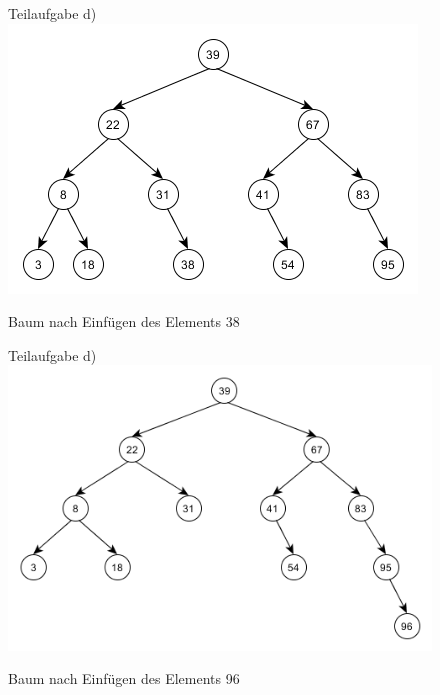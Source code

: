 \documentclass[12pt]{scrartcl}
\begin{document}
\begin{figure}[h!]
\begin{center}
Teilaufgabe d)
\includegraphics[scale=0.8]{Aufgabe2d)B4.png}
\caption{Baum nach Einfügen des Elements 38}
\end{center}
\end{figure}

\newpage

\begin{figure}[h!]
\begin{center}
Teilaufgabe d)
\includegraphics[scale=0.8]{Aufgabe2d)B5.png}
\caption{Baum nach Einfügen des Elements 96}
\end{center}
\end{figure}
\end{document}
